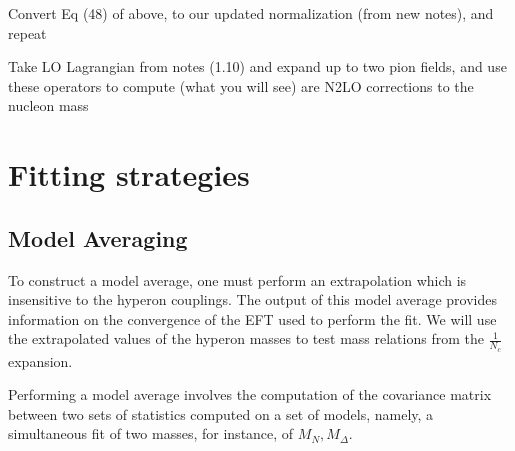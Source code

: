 \documentclass[12pt,tightenlines, raggedbottom, prd, notitlepage]{revtex4-1}
\begin{document}
Convert Eq (48) of above, to our updated normalization (from new notes), and repeat

Take LO Lagrangian from notes (1.10) and expand up to two pion fields, and use these operators to compute (what you will see) are N2LO corrections to the nucleon mass


\section*{Fitting strategies}

\subsection*{Model Averaging}
To construct a model average, one must perform an extrapolation which is insensitive
to the hyperon couplings. The output of this model average provides information on the 
convergence of the EFT used to perform the fit. We will use the extrapolated values of 
the hyperon masses to test mass relations from the $\frac{1}{N_c}$ expansion.

Performing a model average involves the computation of the covariance matrix between
two sets of statistics computed on a set of models, namely, a simultaneous fit of two 
masses, for instance, of $M_N , M_\Delta$. 
\end{document}
